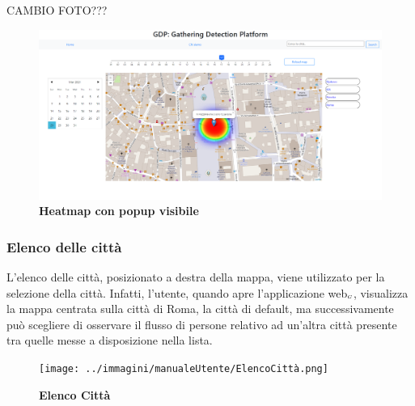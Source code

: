 CAMBIO FOTO???
\begin{center}
	\begin{figure}[H]
		\centering\includegraphics[width=0.9\linewidth]{../immagini/manualeUtente/popup.png}
		\caption{\textbf{\textbf{\textbf{Heatmap con popup visibile}}}}
	\end{figure}
\end{center} 

\subsubsection{Elenco delle città} \label{UtilizzoDiGDPGatheringDetecionPlatformContenutoCentralePaginaInizialeHomeMenùATendina}
L'elenco delle città, posizionato a destra della mappa, viene utilizzato per la selezione della città. Infatti, l'utente, quando apre l'applicazione web$_{\scaleto{G}{3pt}}$, visualizza la mappa centrata sulla città di Roma, la città di default, ma successivamente può scegliere di osservare il flusso di persone relativo ad un'altra città presente tra quelle messe a disposizione nella lista. 
\begin{center}
	\begin{figure}[h]
		\centering\texttt{[image: ../immagini/manualeUtente/ElencoCittà.png]}
		\caption{\textbf{Elenco Città}}
	\end{figure}
\end{center}

